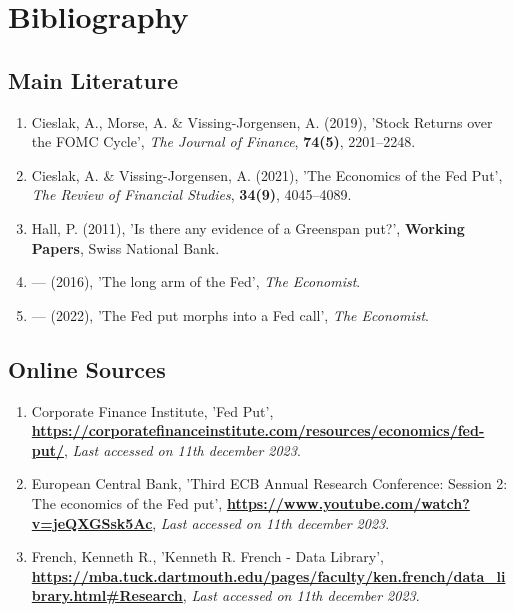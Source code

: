 \chapter*{Bibliography}

\section*{Main Literature}

\begin{enumerate}[label={},left=0pt]

    \item \label{item:cieslak_stock_2019} 
    Cieslak, A., Morse, A. \& Vissing-Jorgensen, A. (2019), 'Stock Returns over the FOMC Cycle', \textit{The Journal of Finance}, \textbf{74(5)}, 2201–2248.
    
    \item \label{item:cieslak_economics_2021} 
    Cieslak, A.  \& Vissing-Jorgensen, A. (2021), 'The Economics of the Fed Put', \textit{The Review of Financial Studies}, \textbf{34(9)}, 4045–4089.

    \item \label{item:hall_is_2011}
    Hall, P. (2011), 'Is there any evidence of a Greenspan put?', \textbf{Working Papers}, Swiss National Bank.

    \item \label{item:economist_2016}
    — (2016), 'The long arm of the Fed', \textit{The Economist}.

    \item \label{item:noauthor_fed_nodate} 
    — (2022), 'The Fed put morphs into a Fed call', \textit{The Economist}.

\end{enumerate}

\section*{Online Sources}
\begin{enumerate}[label={},left=0pt]

    \item \label{item:noauthor_fed_nodate-1} 
    Corporate Finance Institute,  'Fed Put',
    \textbf{\url{https://corporatefinanceinstitute.com/resources/economics/fed-put/}},
    \textit{Last accessed on 11th december 2023}.

    \item \label{item:european_central_bank_third_2018} 
    European Central Bank, 'Third ECB Annual Research Conference: Session 2: The economics of the Fed put', \textbf{\url{https://www.youtube.com/watch?v=jeQXGSsk5Ac}},
    \textit{Last accessed on 11th december 2023}.

    \item \label{item:french_kenneth_nodate} 
    French, Kenneth R.,  'Kenneth R. French - Data Library',
    \textbf{\url{https://mba.tuck.dartmouth.edu/pages/faculty/ken.french/data_library.html\#Research}},
    \textit{Last accessed on 11th december 2023}.
    

\end{enumerate}